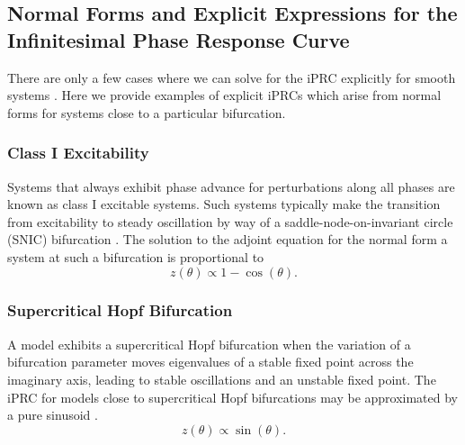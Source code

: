 \documentclass[12pt]{article}
\begin{document}
\subsection{Normal Forms and Explicit Expressions for the Infinitesimal Phase Response Curve}\label{app:explicit_iprcs}
There are only a few cases where we can solve for the iPRC explicitly for smooth systems \cite{ErmentroutTerman2010book}.  Here we provide examples of explicit iPRCs which arise from normal forms for systems close to a particular bifurcation.  
\subsubsection{Class I Excitability}
Systems that always exhibit phase advance for perturbations along all phases are known as class I excitable systems.  Such systems typically make the transition from excitability to steady oscillation by way of a saddle-node-on-invariant circle (SNIC) bifurcation \cite{BrownMoehlisHolmes:2004:NeComp}.   The solution to the adjoint equation for the normal form a system at such a bifurcation is proportional to \cite{Ermentrout1996NeuralComput}
\begin{equation}
z(\theta) \propto 1-\cos(\theta).
\end{equation}

\subsubsection{Supercritical Hopf Bifurcation}
A model exhibits a supercritical Hopf bifurcation when the variation of a bifurcation parameter moves eigenvalues of a stable fixed point across the imaginary axis, leading to stable oscillations and an unstable fixed point.  The iPRC for models close to supercritical Hopf bifurcations may be approximated by a pure sinusoid \cite{BrownMoehlisHolmes:2004:NeComp,Izhikevich2007}.
\begin{equation}
z(\theta) \propto \sin(\theta).
\end{equation}


\newpage


%
\end{document}
